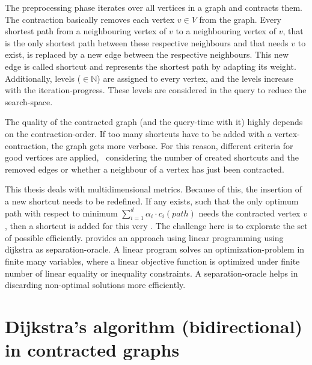     The preprocessing phase iterates over all vertices in a graph and contracts them.
    The contraction basically removes each vertex $v \in V$ from the graph.
    Every shortest path from a neighbouring vertex of $v$ to a neighbouring vertex of $v$, that is the only shortest path between these respective neighbours and that needs $v$ to exist, is replaced by a new edge between the respective neighbours.
    This new edge is called shortcut and represents the shortest path by adapting its \gls{weight}.
    Additionally, levels ($\in \mathbb{N}$) are assigned to every vertex, and the levels increase with the iteration-progress.
    These levels are considered in the query to reduce the search-space.

    The quality of the contracted graph (and the query-time with it) highly depends on the contraction-order.
    If too many shortcuts have to be added with a vertex-contraction, the graph gets more verbose.
    For this reason, different criteria for good vertices are applied, \eg\ considering the number of created shortcuts and the removed edges or whether a neighbour of a vertex has just been contracted.

    This thesis deals with multidimensional \glspl{metric}.
    Because of this, the insertion of a new shortcut needs to be redefined.
    If any \alpha exists, such that the only optimum path with respect to minimum $\sum_{i=1}^{d} \alpha_i \cdot c_i(\mathit{path})$ needs the contracted vertex $v$, then a shortcut is added for this very \alpha.
    The challenge here is to explorate the set of possible \alpha efficiently.
    \cite{funke:personal-routes} provides an approach using linear programming using \gls{dijkstra} as separation-oracle.
    A linear program solves an optimization-problem in finite many variables, where a linear objective function is optimized under finite number of linear equality or inequality constraints.
    A separation-oracle helps in discarding non-optimal solutions more efficiently.

\section{Dijkstra's algorithm (bidirectional) in contracted graphs}
\label{chap:preliminaries:ch-dijkstra}

